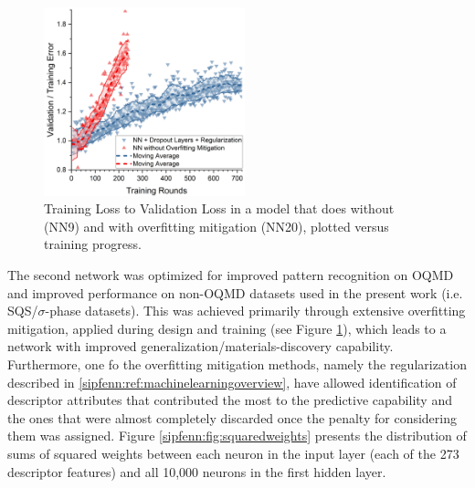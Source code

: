 \begin{figure}
    \vspace{-12pt}
    \centering
    \includegraphics[width=0.52\textwidth]{sipfenn/validationtotraining_generalized.png}
    \caption{Training Loss to Validation Loss in a model that does without (NN9) and with overfitting mitigation (NN20), plotted versus training progress.}
    \label{sipfenn:fig:trainingvalidation-body}
\end{figure}

The second network was optimized for improved pattern recognition on OQMD and improved performance on non-OQMD datasets used in the present work (i.e. SQS/$\sigma$-phase datasets). This was achieved primarily through extensive overfitting mitigation, applied during design and training (see Figure \ref{sipfenn:fig:trainingvalidation-body}), which leads to a network with improved generalization/materials-discovery capability. Furthermore, one fo the overfitting mitigation methods, namely the regularization described in \ref{sipfenn:ref:machinelearningoverview}, have allowed identification of descriptor attributes that contributed the most to the predictive capability and the ones that were almost completely discarded once the penalty for considering them was assigned. Figure \ref{sipfenn:fig:squaredweights} presents the distribution of sums of squared weights between each neuron in the input layer (each of the 273 descriptor features) and all 10,000 neurons in the first hidden layer. 

